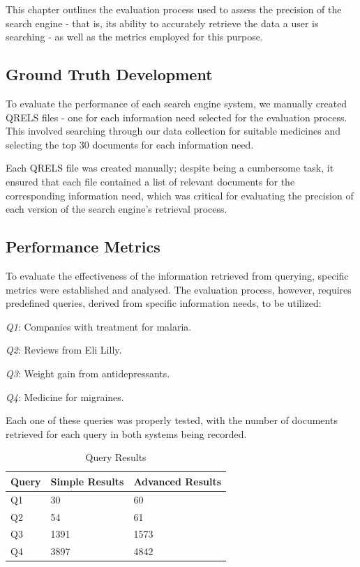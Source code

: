 \documentclass[sigconf]{acmart}
\begin{document}
This chapter outlines the evaluation process used to assess the precision of the search engine - that is, its ability to accurately retrieve the data a user is searching - as well as the metrics employed for this purpose.

\subsection{Ground Truth Development}

To evaluate the performance of each search engine system, we manually created QRELS\cite{qrels} files - one for each information need selected for the evaluation process. This involved searching through our data collection for suitable medicines and selecting the top 30 documents for each information need.

Each QRELS file was created manually; despite being a cumbersome task, it ensured that each file contained a list of relevant documents for the corresponding information need, which was critical for evaluating the precision of each version of the search engine's retrieval process.

\subsection{Performance Metrics}

To evaluate the effectiveness of the information retrieved from querying, specific metrics were established and analysed. The evaluation process, however, requires predefined queries, derived from specific information needs, to be utilized:

\begin{arrowlist}
	\item \textit{Q1}: Companies with treatment for malaria.
	\item \textit{Q2}: Reviews from Eli Lilly.
	\item \textit{Q3}: Weight gain from antidepressants.
	\item \textit{Q4}: Medicine for migraines.
\end{arrowlist}

Each one of these queries was properly tested, with the number of documents retrieved for each query in both systems being recorded.

\begin{table}[H]
	\begin{tabular}{ | m{5em} | m{1cm}| m{1.2cm} | } 
		\hline
		Query& Simple Results & Advanced Results \\ 
		\hline
		Q1 & 30 & 60 \\ 
		\hline
		Q2 & 54 & 61 \\ 
		\hline
		Q3 & 1391 & 1573 \\ 
		\hline
		Q4 & 3897 & 4842 \\ 
		\hline
	\end{tabular}
	\caption{Query Results}
	\label{tab:query_results}
\end{table}
\end{document}
